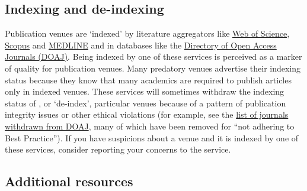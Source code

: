 \documentclass[letterpaper, 12pt]{article}
\begin{document}
\subsection*{Indexing and de-indexing}

Publication venues are `indexed' by literature aggregators like \href{https://www.webofscience.com/wos/}{Web of Science}, \href{https://www.scopus.com}{Scopus} and \href{https://www.nlm.nih.gov/medline/medline_home.html}{MEDLINE} and in databases like the \href{https://doaj.org/}{Directory of Open Access Journals (DOAJ)}. Being indexed by one of these services is perceived as a marker of quality for publication venues. Many predatory venues advertise their indexing status because they know that many academics are required to publish articles only in indexed venues. These services will sometimes withdraw the indexing status of , or `de-index', particular venues because of a pattern of publication integrity issues or other ethical violations (for example, see the \href{https://docs.google.com/spreadsheets/d/1Kv3MbgFSgtSDnEGkA2JacrSjunRu0umHeZCtcMeqO5E/edit?gid=2104690845\#gid=2104690845}{list of journals withdrawn from DOAJ}, many of which have been removed for ``not adhering to Best Practice''). If you have suspicions about a venue and it is indexed by one of these services, consider reporting your concerns to the service.

\subsection*{Additional resources}
\end{document}

